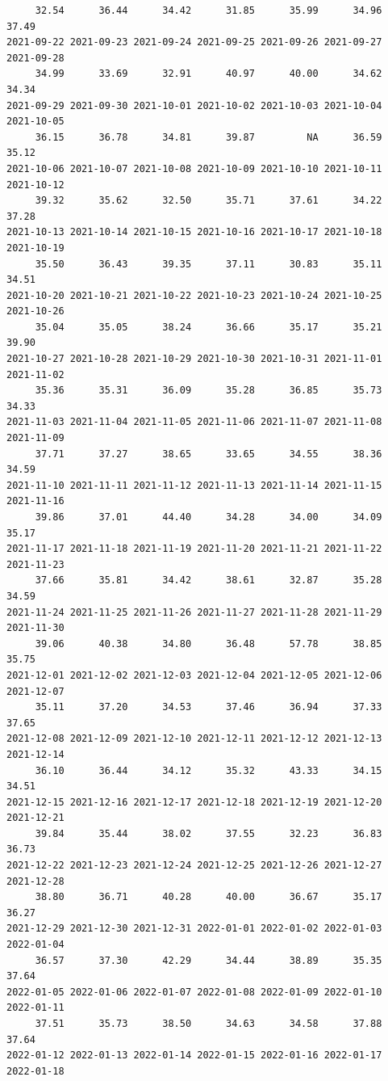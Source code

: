 \documentclass[
  letterpaper,
  DIV=11,
  numbers=noendperiod]{scrartcl}
\begin{document}
\begin{verbatim}
     32.54      36.44      34.42      31.85      35.99      34.96      37.49 
2021-09-22 2021-09-23 2021-09-24 2021-09-25 2021-09-26 2021-09-27 2021-09-28 
     34.99      33.69      32.91      40.97      40.00      34.62      34.34 
2021-09-29 2021-09-30 2021-10-01 2021-10-02 2021-10-03 2021-10-04 2021-10-05 
     36.15      36.78      34.81      39.87         NA      36.59      35.12 
2021-10-06 2021-10-07 2021-10-08 2021-10-09 2021-10-10 2021-10-11 2021-10-12 
     39.32      35.62      32.50      35.71      37.61      34.22      37.28 
2021-10-13 2021-10-14 2021-10-15 2021-10-16 2021-10-17 2021-10-18 2021-10-19 
     35.50      36.43      39.35      37.11      30.83      35.11      34.51 
2021-10-20 2021-10-21 2021-10-22 2021-10-23 2021-10-24 2021-10-25 2021-10-26 
     35.04      35.05      38.24      36.66      35.17      35.21      39.90 
2021-10-27 2021-10-28 2021-10-29 2021-10-30 2021-10-31 2021-11-01 2021-11-02 
     35.36      35.31      36.09      35.28      36.85      35.73      34.33 
2021-11-03 2021-11-04 2021-11-05 2021-11-06 2021-11-07 2021-11-08 2021-11-09 
     37.71      37.27      38.65      33.65      34.55      38.36      34.59 
2021-11-10 2021-11-11 2021-11-12 2021-11-13 2021-11-14 2021-11-15 2021-11-16 
     39.86      37.01      44.40      34.28      34.00      34.09      35.17 
2021-11-17 2021-11-18 2021-11-19 2021-11-20 2021-11-21 2021-11-22 2021-11-23 
     37.66      35.81      34.42      38.61      32.87      35.28      34.59 
2021-11-24 2021-11-25 2021-11-26 2021-11-27 2021-11-28 2021-11-29 2021-11-30 
     39.06      40.38      34.80      36.48      57.78      38.85      35.75 
2021-12-01 2021-12-02 2021-12-03 2021-12-04 2021-12-05 2021-12-06 2021-12-07 
     35.11      37.20      34.53      37.46      36.94      37.33      37.65 
2021-12-08 2021-12-09 2021-12-10 2021-12-11 2021-12-12 2021-12-13 2021-12-14 
     36.10      36.44      34.12      35.32      43.33      34.15      34.51 
2021-12-15 2021-12-16 2021-12-17 2021-12-18 2021-12-19 2021-12-20 2021-12-21 
     39.84      35.44      38.02      37.55      32.23      36.83      36.73 
2021-12-22 2021-12-23 2021-12-24 2021-12-25 2021-12-26 2021-12-27 2021-12-28 
     38.80      36.71      40.28      40.00      36.67      35.17      36.27 
2021-12-29 2021-12-30 2021-12-31 2022-01-01 2022-01-02 2022-01-03 2022-01-04 
     36.57      37.30      42.29      34.44      38.89      35.35      37.64 
2022-01-05 2022-01-06 2022-01-07 2022-01-08 2022-01-09 2022-01-10 2022-01-11 
     37.51      35.73      38.50      34.63      34.58      37.88      37.64 
2022-01-12 2022-01-13 2022-01-14 2022-01-15 2022-01-16 2022-01-17 2022-01-18 

\end{verbatim}
\end{document}
